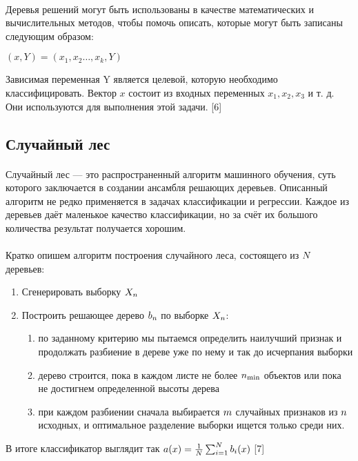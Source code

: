 \documentclass{article}
\begin{document}
	\paragraph{}
	Деревья решений могут быть использованы в качестве математических и вычислительных методов, чтобы помочь описать, которые могут быть записаны следующим образом:\\
	\begin{center}
		$(x, Y) = (x_1, x_2 \dots, x_k, Y)$
	\end{center}
	
	Зависимая переменная Y является целевой, которую необходимо классифицировать. Вектор $x$ состоит из входных переменных $x_1,  x_2,  x_3$ и т. д. Они используются для выполнения этой задачи. [6]
	\subsection{Случайный лес}
	\paragraph{}
	Случайный лес — это распространенный алгоритм машинного обучения, суть которого заключается в создании ансамбля решающих деревьев. Описанный алгоритм не редко применяется в задачах классификации и регрессии. Каждое из деревьев даёт маленькое качество классификации, но за счёт их большого количества результат получается хорошим.
	\paragraph{}
	Кратко опишем алгоритм построения случайного леса, состоящего из $\large N$ деревьев:
	\begin{enumerate}
		\item Сгенерировать выборку $\large X_n$
		\item Построить решающее дерево $\large b_n$ по выборке $\large X_n$:
		\begin{enumerate}
			\item по заданному критерию мы пытаемся определить наилучший признак и продолжать разбиение в дереве уже по нему и так до исчерпания выборки
			\item дерево строится, пока в каждом листе не более $\large n_\text{min}$ объектов или пока не достигнем определенной высоты дерева
			\item при каждом разбиении сначала выбирается $\large m$ случайных признаков из $\large n$ исходных,
			и оптимальное разделение выборки ищется только среди них.
		\end{enumerate}
	\end{enumerate}
	В итоге классификатор выглядит так $\large a(x) = \frac{1}{N}\sum_{i = 1}^N b_i(x)$ [7]
\end{document}
